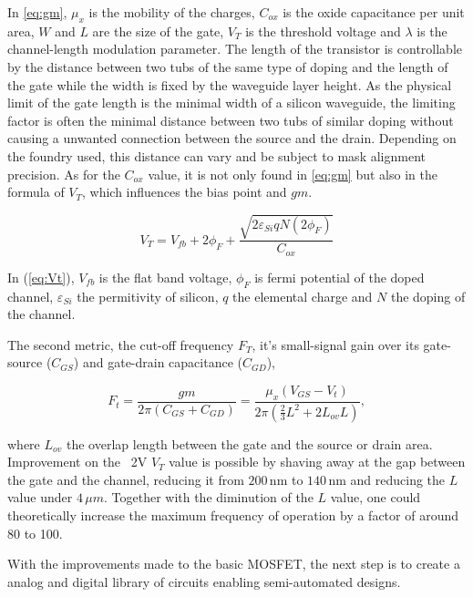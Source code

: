 In \ref{eq:gm}, $\mu_x$ is the mobility of the charges, $C_{ox}$ is the oxide capacitance per unit area, $W$ and $L$ are the size of the gate, $V_T$ is the threshold voltage and $\lambda$ is the channel-length modulation parameter. 
The length of the transistor is controllable by the distance between two tubs of the same type of doping and the length of the gate while the width is fixed by the waveguide layer height.
As the physical limit of the gate length is the minimal width of a silicon waveguide, the limiting factor is often the minimal distance between two tubs of similar doping without causing a unwanted connection between the source and the drain.
Depending on the foundry used, this distance can vary and be subject to mask alignment precision. 
As for the $C_{ox}$ value, it is not only found in \ref{eq:gm} but also in the formula of $V_T$, which influences the bias point and $gm$.

\begin{equation}
\label{eq:Vt}
V_T = V_{fb} + 2\phi_F + \frac{\sqrt{2\varepsilon_{Si} qN(2\phi_F)}}{C_{ox}}
\end{equation}

In (\ref{eq:Vt}), $V_{fb}$ is the flat band voltage,  $\phi_F$ is fermi potential of the doped channel, $\varepsilon_{Si}$ the permitivity of silicon, $q$ the elemental charge and $N$ the doping of the channel.

The second metric, the cut-off frequency $F_T$, it's small-signal gain over its gate-source ($C_{GS}$) and gate-drain capacitance ($C_{GD}$), %

\begin{equation}
\label{eq:Ft}
F_t = \frac{gm}{2\pi(C_{GS}+C_{GD})} = \frac{\mu_x(V_{GS}-V_t)}{2\pi (\frac{2}{3}L^2+2L_{ov}L)},
\end{equation}

where $L_{ov}$ the overlap length between the gate and the source or drain area.
Improvement on the ~2V $V_T$ value \cite{zanetto_unconventional_2023} is possible by shaving away at the gap between the gate and the channel, reducing it from $200\,\text{nm}$ to $140\,\text{nm}$ and reducing the $L$ value under $4\,\mu m$. 
Together with the diminution of the $L$ value, one could theoretically increase the maximum frequency of operation by a factor of around 80 to 100.

With the improvements made to the basic MOSFET, the next step is to create a analog and digital library of circuits enabling semi-automated designs. 





